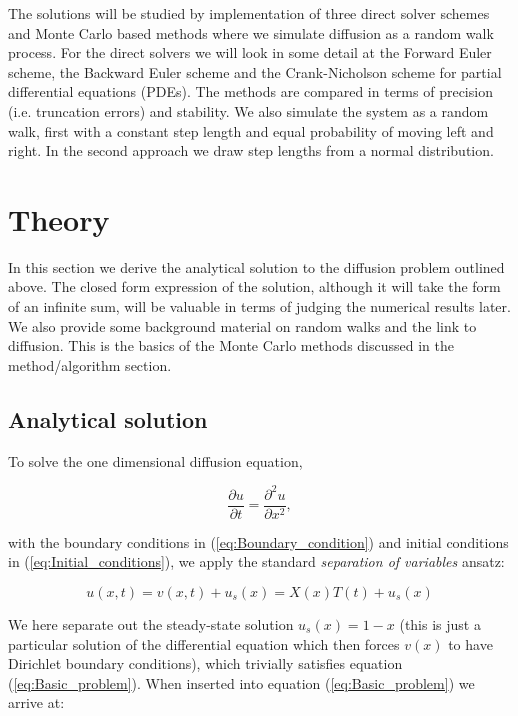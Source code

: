 \documentclass[a4paper, 11pt, notitlepage,english]{article}
\begin{document}
The solutions will be studied by implementation of three direct solver schemes and Monte Carlo based methods where we simulate diffusion as a random walk process. For the direct solvers we will look in some detail at the Forward Euler scheme, the Backward Euler scheme and the Crank-Nicholson scheme for partial differential equations (PDEs). The methods are compared in terms of precision (i.e. truncation errors) and stability. We also simulate the system as a random walk, first with a constant step length and equal probability of moving left and right. In the second approach we draw step lengths from a normal distribution. 

\section{Theory}

In this section we derive the analytical solution to the diffusion problem outlined above. The closed form expression of the solution, although it will take the form of an infinite sum, will be valuable in terms of judging the numerical results later. We also provide some background material on random walks and the link to diffusion. This is the basics of the Monte Carlo methods discussed in the method/algorithm section.

\subsection{Analytical solution}
To solve the one dimensional diffusion equation, 

\begin{equation}
\frac{\partial u}{\partial t} = \frac{\partial^2 u}{\partial x^2},
\label{eq:Basic_problem}
\end{equation}

with the boundary conditions in (\ref{eq:Boundary_condition}) and initial conditions in (\ref{eq:Initial_conditions}), we apply the standard \emph{separation of variables} ansatz:

\begin{equation}
 u(x,t) = v(x,t) + u_s(x) = X(x)T(t) + u_s(x)
\label{eq:Separation of variables}
\end{equation}

We here separate out the steady-state solution $u_s(x) = 1-x$ (this is just a particular solution of the differential equation which then forces $v(x)$ to have Dirichlet boundary conditions), which trivially satisfies equation (\ref{eq:Basic_problem}). When inserted into equation (\ref{eq:Basic_problem}) we arrive at:
\end{document}
